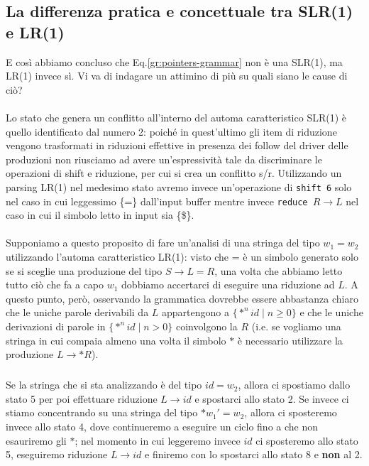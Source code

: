 \documentclass[class=book, crop=false, oneside, 12pt]{standalone}
\begin{document}
\subsection{La differenza pratica e concettuale tra SLR(1) e LR(1)}
E così abbiamo concluso che Eq.\ref{gr:pointers-grammar} non è una SLR(1), ma LR(1) invece sì. Vi va di indagare un attimino di più su quali siano le cause di ciò?
\paragraph*{}
Lo stato che genera un conflitto all'interno del automa caratteristico SLR(1) è quello identificato dal numero 2: poiché in quest'ultimo gli item di riduzione vengono trasformati in riduzioni effettive in presenza dei follow del driver delle produzioni non riusciamo ad avere un'espressività tale da discriminare le operazioni di shift e riduzione, per cui si crea un conflitto s/r. Utilizzando un parsing LR(1) nel medesimo stato avremo invece un'operazione di \texttt{shift 6} solo nel caso in cui leggessimo \{=\} dall'input buffer mentre invece \texttt{reduce \(R \to L\)} nel caso in cui il simbolo letto in input sia \{\$\}.
\paragraph*{}
Supponiamo a questo proposito di fare un'analisi di una stringa del tipo \(w_1 = w_2\) utilizzando l'automa caratteristico LR(1): visto che = è un simbolo generato solo se si sceglie una produzione del tipo \(S \to L = R\), una volta che abbiamo letto tutto ciò che fa a capo \(w_1\) dobbiamo accertarci di eseguire una riduzione ad \(L\). A questo punto, però, osservando la grammatica dovrebbe essere abbastanza chiaro che le uniche parole derivabili da \(L\) appartengono a \(\{*^n id \mid n \geq 0\}\) e che le uniche derivazioni di parole in \(\{*^n id \mid n > 0\}\) coinvolgono la \(R\) (i.e. se vogliamo una stringa in cui compaia almeno una volta il simbolo \(\ast\) è necessario utilizzare la produzione \(L \rightarrow *R\)).
\subparagraph*{}
Se la stringa che si sta analizzando è del tipo \(id = w_2\), allora ci spostiamo dallo stato 5 per poi effettuare riduzione \(L \to id\) e spostarci allo stato 2. Se invece ci stiamo concentrando su una stringa del tipo \(*w_1' = w_2\), allora ci sposteremo invece allo stato 4, dove continueremo a eseguire un ciclo fino a che non esauriremo gli \(*\); nel momento in cui leggeremo invece \(id\) ci sposteremo allo stato 5, eseguiremo riduzione \(L \to id\) e finiremo con lo spostarci allo stato 8 e \textbf{non} al 2. 
\end{document}
